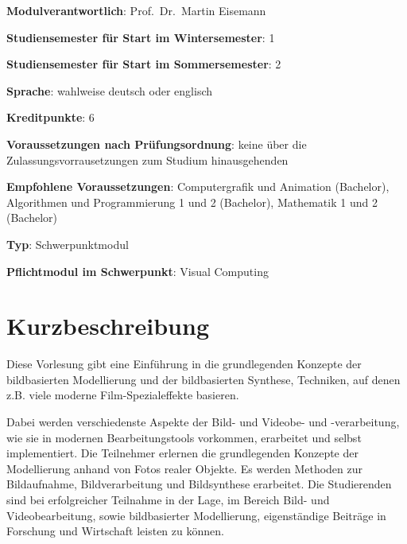 \begin{modulHead}
\textbf{Modulverantwortlich}: Prof.~Dr.~Martin
Eisemann
\end{modulHead}
\begin{modulHead}
\textbf{Studiensemester für
Start im Wintersemester}:
1
\end{modulHead}
\begin{modulHead}
\textbf{Studiensemester für Start
im Sommersemester}:
2
\end{modulHead}
\begin{modulHead}
\textbf{Sprache}: wahlweise deutsch
oder englisch
\end{modulHead}
\begin{modulHead}
\textbf{Kreditpunkte}:
6
\end{modulHead}
\begin{modulHead}
\textbf{Voraussetzungen nach
Prüfungsordnung}: keine über die Zulassungsvorrausetzungen zum Studium
hinausgehenden
\end{modulHead}
\begin{modulHead}
\textbf{Empfohlene
Voraussetzungen}: Computergrafik und Animation (Bachelor), Algorithmen
und Programmierung 1 und 2 (Bachelor), Mathematik 1 und 2
(Bachelor)
\end{modulHead}
\begin{modulHead}
\textbf{Typ}:
Schwerpunktmodul
\end{modulHead}
\begin{modulHead}
\textbf{Pflichtmodul
im Schwerpunkt}: Visual Computing
\end{modulHead}


\section*{Kurzbeschreibung\label{/mi-2017/modulbeschreibungen-master/MA_VC_Modul_BildbasierteComputergrafik}}\label{kurzbeschreibungpathlabelmi-2017modulbeschreibungen-mastermaux5fvcux5fmodulux5fbildbasiertecomputergrafik}

Diese Vorlesung gibt eine Einführung in die grundlegenden Konzepte der
bildbasierten Modellierung und der bildbasierten Synthese, Techniken,
auf denen z.B. viele moderne Film-Spezialeffekte basieren.

Dabei werden verschiedenste Aspekte der Bild- und Videobe- und
-verarbeitung, wie sie in modernen Bearbeitungstools vorkommen,
erarbeitet und selbst implementiert. Die Teilnehmer erlernen die
grundlegenden Konzepte der Modellierung anhand von Fotos realer Objekte.
Es werden Methoden zur Bildaufnahme, Bildverarbeitung und Bildsynthese
erarbeitet. Die Studierenden sind bei erfolgreicher Teilnahme in der
Lage, im Bereich Bild- und Videobearbeitung, sowie bildbasierter
Modellierung, eigenständige Beiträge in Forschung und Wirtschaft leisten
zu können.

